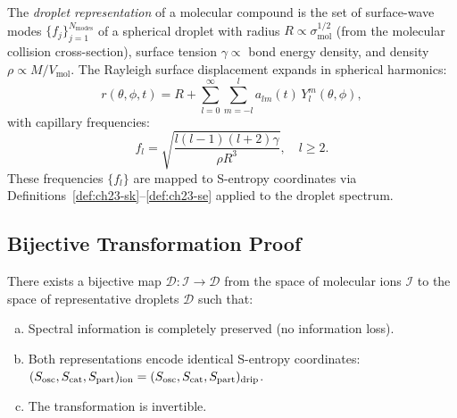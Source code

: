 \begin{definition}
\label{def:ch23-drip-repr}
The \emph{droplet representation} of a molecular compound is the set of
surface-wave modes $\{f_j\}_{j=1}^{N_{\mathrm{modes}}}$ of a spherical
droplet with radius $R \propto \sigma_{\mathrm{mol}}^{1/2}$ (from the
molecular collision cross-section), surface tension $\gamma \propto$ bond
energy density, and density $\rho \propto M/V_{\mathrm{mol}}$.  The Rayleigh
surface displacement expands in spherical harmonics:
\[
  r(\theta,\phi,t) = R + \sum_{l=0}^\infty \sum_{m=-l}^{l}
    a_{lm}(t)\,Y_l^m(\theta,\phi),
\]
with capillary frequencies:
\[
  f_l = \sqrt{\frac{l(l-1)(l+2)\gamma}{\rho R^3}}, \quad l \geq 2.
\]
These frequencies $\{f_l\}$ are mapped to S-entropy coordinates via
Definitions~\ref{def:ch23-sk}--\ref{def:ch23-se} applied to the droplet
spectrum.
\end{definition}

\subsection{Bijective Transformation Proof}
\label{sec:ch23-bijection-proof}

\begin{theorem}
\label{thm:ch23-bijection}
There exists a bijective map $\mathcal{D} : \mathcal{I} \to \mathcal{D}$
from the space of molecular ions $\mathcal{I}$ to the space of representative
droplets $\mathcal{D}$ such that:
\begin{enumerate}[(a)]
  \item Spectral information is completely preserved (no information loss).
  \item Both representations encode identical S-entropy coordinates:
    $(S_{\mathrm{osc}}, S_{\mathrm{cat}}, S_{\mathrm{part}})_{\mathrm{ion}} = (S_{\mathrm{osc}}, S_{\mathrm{cat}}, S_{\mathrm{part}})_{\mathrm{drip}}$.
  \item The transformation is invertible.
\end{enumerate}
\end{theorem}

